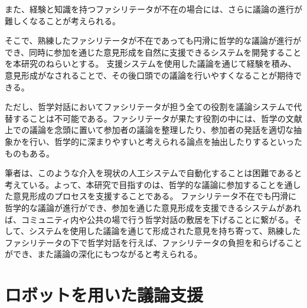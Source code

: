 \documentclass[11pt, a4paper]{jreport} %
\begin{document}
また、経験と知識を持つファシリテータが不在の場合には、さらに議論の進行が難しくなることが考えられる。


そこで、熟練したファシリテータが不在であっても円滑に哲学的な議論が進行ができ、同時に参加を通じた意見形成を自然に支援できるシステムを開発することを本研究のねらいとする。
支援システムを使用した議論を通じて経験を積み、意見形成がなされることで、その後口頭での議論を行いやすくなることが期待できる。


ただし、哲学対話においてファシリテータが担う全ての役割を議論システムで代替することは不可能である。ファシリテータが果たす役割の中には、哲学の文献上での議論を念頭に置いて参加者の議論を整理したり、参加者の発話を適切な抽象かを行い、哲学的に深まりやすいと考えられる論点を抽出したりするといったものもある。

筆者は、このような介入を現状の人工システムで自動化することは困難であると考えている。よって、本研究で目指すのは、哲学的な議論に参加することを通した意見形成のプロセスを支援することである。
ファシリテータ不在でも円滑に哲学的な議論が進行ができ、参加を通じた意見形成を支援できるシステムがあれば、コミュニティ内や公共の場で行う哲学対話の敷居を下げることに繋がる。そして、システムを使用した議論を通じて形成された意見を持ち寄って、熟練したファシリテータの下で哲学対話を行えば、ファシリテータの負担を和らげることができ、また議論の深化にもつながると考えられる。










\chapter{ロボットを用いた議論支援}
\end{document}
